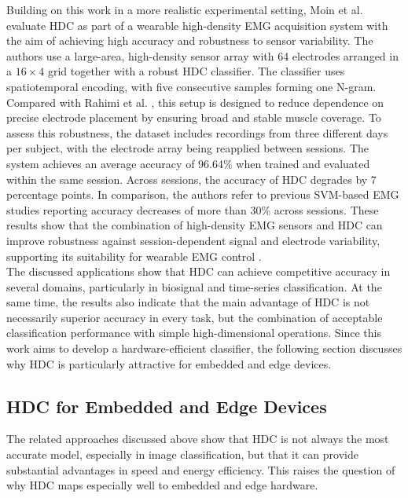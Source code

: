        Building on this work in a more realistic experimental setting, Moin et al. \cite{moin_emg_2018} evaluate HDC as part of a wearable high-density EMG acquisition system with the aim of achieving high accuracy and robustness to sensor variability. The authors use a large-area, high-density sensor array with 64 electrodes arranged in a $16 \times 4$ grid together with a robust HDC classifier. The classifier uses spatiotemporal encoding, with five consecutive samples forming one N-gram. Compared with Rahimi et al. \cite{rahimi_hyperdimensional_2016}, this setup is designed to reduce dependence on precise electrode placement by ensuring broad and stable muscle coverage. To assess this robustness, the dataset includes recordings from three different days per subject, with the electrode array being reapplied between sessions. 
        The system achieves an average accuracy of 96.64\% when trained and evaluated within the same session. Across sessions, the accuracy of HDC degrades by 7 percentage points. In comparison, the authors refer to previous SVM-based EMG studies reporting accuracy decreases of more than 30\% across sessions. These results show that the combination of high-density EMG sensors and HDC can improve robustness against session-dependent signal and electrode variability, supporting its suitability for wearable EMG control \cite{moin_emg_2018}.\\

        
        The discussed applications show that HDC can achieve competitive accuracy in several domains, particularly in biosignal and time-series classification. At the same time, the results also indicate that the main advantage of HDC is not necessarily superior accuracy in every task, but the combination of acceptable classification performance with simple high-dimensional operations. Since this work aims to develop a hardware-efficient classifier, the following section discusses why HDC is particularly attractive for embedded and edge devices.

    
    \subsection{HDC for Embedded and Edge Devices}
    \label{sec:HDC_for_hardware}
    The related approaches discussed above show that HDC is not always the most accurate model, especially in image classification, but that it can provide substantial advantages in speed and energy efficiency. This raises the question of why HDC maps especially well to embedded and edge hardware.
    
